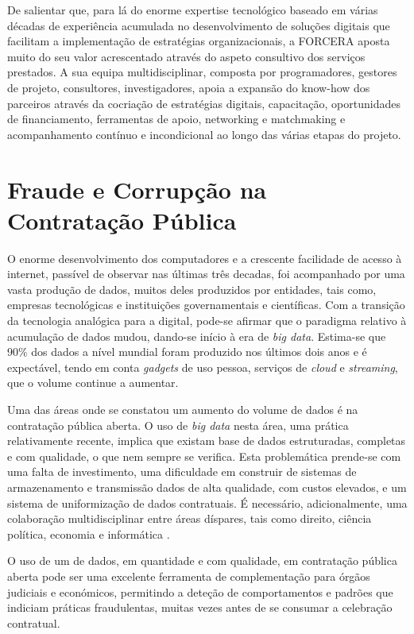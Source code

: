 De salientar que, para lá do enorme expertise tecnológico baseado em várias décadas de experiência acumulada no desenvolvimento de soluções digitais que facilitam a implementação de estratégias organizacionais, a FORCERA aposta muito do seu valor acrescentado através do aspeto consultivo dos serviços prestados. A sua equipa multidisciplinar, composta por programadores, gestores de projeto, consultores, investigadores, apoia a expansão do know-how dos parceiros através da cocriação de estratégias digitais, capacitação, oportunidades de financiamento, ferramentas de apoio, networking e matchmaking e acompanhamento contínuo e incondicional ao longo das várias etapas do projeto.



\section{Fraude e Corrupção na Contratação Pública}

O enorme desenvolvimento dos computadores e a crescente facilidade de acesso à internet, passível de observar nas últimas três decadas, foi acompanhado por uma vasta produção de dados, muitos deles produzidos por entidades, tais como, empresas tecnológicas e instituições governamentais e científicas. Com a transição da tecnologia analógica para a digital, pode-se afirmar que o paradigma relativo à acumulação de dados mudou, dando-se início à era de \textit{big data}. Estima-se que 90\% dos dados a nível mundial foram produzido nos últimos dois anos e é expectável, tendo em conta \textit{gadgets} de uso pessoa, serviços de \textit{cloud} e \textit{streaming}, que o volume continue a aumentar\cite{bigdata}. 

Uma das áreas onde se constatou um aumento do volume de dados é na contratação pública aberta. O uso de \textit{big data} nesta área, uma prática relativamente recente, implica que existam base de dados estruturadas, completas e com qualidade, o que nem sempre se verifica. Esta problemática prende-se com uma falta de investimento, uma dificuldade em construir de sistemas de armazenamento e transmissão dados de alta qualidade, com custos elevados, e um sistema de uniformização de dados contratuais. É necessário, adicionalmente, uma colaboração multidisciplinar entre áreas díspares, tais como direito, ciência política, economia e informática\cite{inbook} \cite{ocp_brief}.

O uso de um de dados, em quantidade e com qualidade, em contratação pública aberta pode ser uma excelente ferramenta de complementação para órgãos judiciais e económicos, permitindo a deteção de comportamentos e padrões que indiciam práticas fraudulentas, muitas vezes antes de se consumar a celebração contratual\cite{redflags_guide}. 



